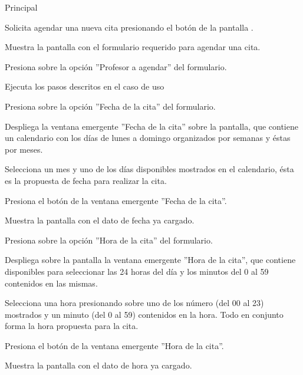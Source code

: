 \begin{UCtrayectoria}{Principal}

	\UCpaso [\UCactor] Solicita agendar una nueva cita presionando el botón \IUbutton{ + } de la pantalla . 

	\UCpaso Muestra la pantalla  con el formulario requerido para agendar una cita. \label{l_EM_Citas_CU2_formulario}

	\UCpaso [\UCactor] Presiona sobre la opción ''Profesor a agendar'' del formulario. 

	\UCpaso Ejecuta los pasos descritos en el caso de uso 

	\UCpaso [\UCactor] Presiona sobre la opción ''Fecha de la cita'' del formulario. \label{l_EM_Citas_CU2_fecha} 

	\UCpaso Despliega la ventana emergente ''Fecha de la cita'' sobre la pantalla, que contiene un calendario con los días de lunes a domingo organizados por semanas y éstas por meses. 

	\UCpaso [\UCactor] Selecciona un mes y uno de los días disponibles mostrados en el calendario, ésta es la propuesta de fecha para realizar la cita.

	\UCpaso [\UCactor] Presiona el botón  de la ventana emergente ''Fecha de la cita''. 

	\UCpaso Muestra la pantalla  con el dato de fecha ya cargado.

	\UCpaso [\UCactor] Presiona sobre la opción ''Hora de la cita'' del formulario. \label{l_EM_Citas_CU2_hora}

	\UCpaso Despliega sobre la pantalla la ventana emergente ''Hora de la cita'', que contiene disponibles para seleccionar las 24 horas del día y los minutos del 0 al 59 contenidos en las mismas.

	\UCpaso [\UCactor] Selecciona una hora presionando sobre uno de los número (del 00 al 23) mostrados y un minuto (del 0 al 59) contenidos en la hora. Todo en conjunto forma la hora propuesta para la cita.

	\UCpaso [\UCactor] Presiona el botón  de la ventana emergente ''Hora de la cita''. 

	\UCpaso Muestra la pantalla  con el dato de hora ya cargado.


\end{UCtrayectoria}
